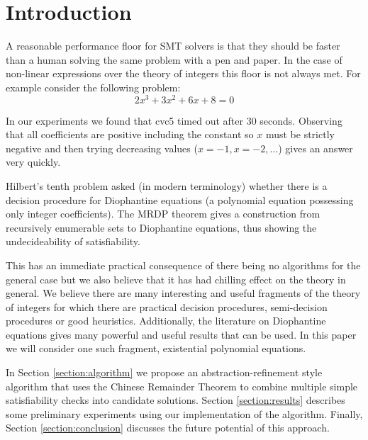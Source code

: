 \section{Introduction}

A reasonable performance floor for SMT solvers is that they should be
faster than a human solving the same problem with a pen and paper.
%
In the case of non-linear expressions over the theory of integers this
floor is not always met.
%
For example consider the following problem: 
\[2x^3 + 3x^2 + 6x + 8 = 0\]

In our experiments we found that cvc5 timed out after 30 
seconds.
Observing that all coefficients are positive including the
constant so $x$ must be strictly negative and then trying decreasing
values ($x = -1, x = -2, \dots$) gives an answer very quickly.

Hilbert's tenth problem asked (in modern terminology) whether 
there is a decision procedure for Diophantine equations 
(a polynomial equation possessing only integer coefficients).
%
The MRDP \cite{LogicMattersMRDP} theorem gives a construction from recursively enumerable sets
to Diophantine equations, thus showing the undecideability of satisfiability.

This has an immediate practical consequence of there being no
algorithms for the general case but we also believe that it has had
chilling effect on the theory in general.
%
We believe there are many interesting and useful fragments of the
theory of integers for which there are practical decision procedures,
semi-decision procedures or good heuristics.
%
Additionally, the literature on Diophantine equations gives many
powerful and useful results that can be used.
%
In this paper we will consider one such fragment, existential
polynomial equations.

In Section \ref{section:algorithm} we propose an
abstraction-refinement style algorithm that uses the Chinese Remainder
Theorem to combine multiple simple satisfiability checks into
candidate solutions.
Section \ref{section:results} describes some preliminary experiments
using our implementation of the algorithm.
Finally, Section \ref{section:conclusion} discusses the future
potential of this approach.
